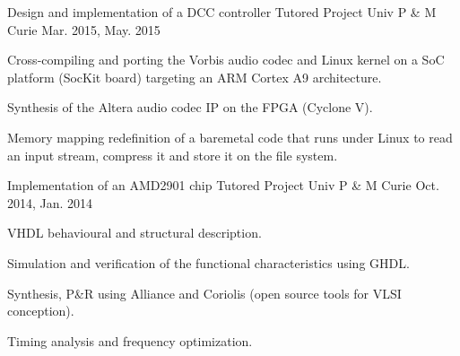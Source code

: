 \begin{cventries}
  \cventry
    {Design and implementation of a DCC controller}%
    {Tutored Project} %
    {Univ P \& M Curie} %
    {Mar. 2015, May. 2015} %
    {
      \begin{cvitems} %
	\item {Cross-compiling and porting the Vorbis audio codec and Linux kernel on a SoC platform (SocKit board) targeting an ARM Cortex A9 architecture.}
	\item {Synthesis of the Altera audio codec IP on the FPGA (Cyclone V).}
	\item {Memory mapping redefinition of a baremetal code that runs under Linux to read an input stream, compress it and store it on the file system.}
      \end{cvitems}
    }

  \cventry
    {Implementation of an AMD2901 chip}%
    {Tutored Project} %
    {Univ P \& M Curie} %
    {Oct. 2014, Jan. 2014} %
    {
      \begin{cvitems} %
        \item {VHDL behavioural and structural description.}
        \item {Simulation and verification of the functional characteristics using GHDL.}
        \item {Synthesis, P\&R using Alliance and Coriolis (open source tools for VLSI conception).}
        \item {Timing analysis and frequency optimization.}
      \end{cvitems}
    }

\end{cventries}
